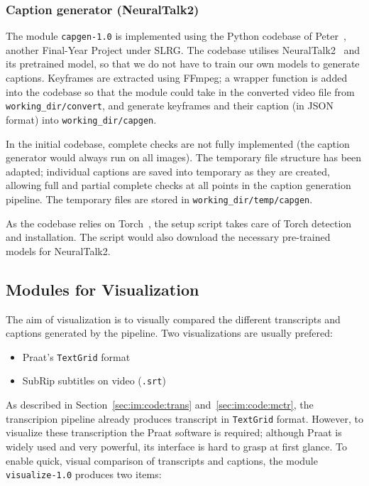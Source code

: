 \subsubsection{Caption generator (NeuralTalk2)}

The module \texttt{capgen-1.0} is implemented using the Python codebase of
Peter~\cite{peter}, another Final-Year Project under SLRG\@. The codebase
utilises NeuralTalk2~\cite{gh-nrtalk2} and its pretrained model, so that
we do not have to train our own models to generate captions. Keyframes are
extracted using FFmpeg; a wrapper function is added into the codebase so
that the module could take in the converted video file from
\texttt{working\_dir/convert}, and generate keyframes and their caption
(in JSON format) into \texttt{working\_dir/capgen}.

In the initial codebase, complete checks are not fully implemented (the
caption generator would always run on all images). The temporary file
structure has been adapted; individual captions are saved into temporary as
they are created, allowing full and partial complete checks at all points
in the caption generation pipeline. The temporary files are stored in
\texttt{working\_dir/temp/capgen}.

As the codebase relies on Torch~\cite{th}, the setup script takes care
of Torch detection and installation. The script would also download the
necessary pre-trained models for NeuralTalk2.

\subsection{Modules for Visualization}\label{sec:im:code:viz}

The aim of visualization is to visually compared the different transcripts
and captions generated by the pipeline. Two visualizations are usually
prefered:

\begin{itemize}
    \item Praat's \texttt{TextGrid} format
    \item SubRip subtitles on video (\texttt{.srt})~\cite{srt}
\end{itemize}

As described in Section~\ref{sec:im:code:trans} and~\ref{sec:im:code:mctr},
the transcripion pipeline already produces transcript in \texttt{TextGrid}
format. However, to visualize these transcription the Praat software is
required; although Praat is widely used and very powerful, its interface is
hard to grasp at first glance. To enable quick, visual comparison of transcripts
and captions, the module \texttt{visualize-1.0} produces two items:

